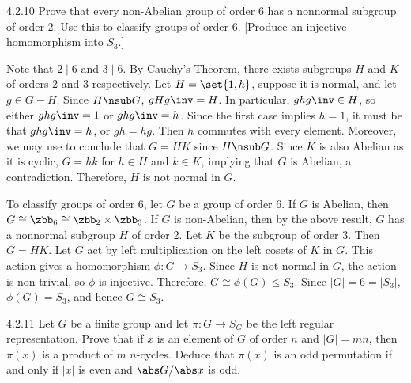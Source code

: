 \begin{exercise}{4.2.10}
	Prove that every non-Abelian group of order 6 has a nonnormal subgroup of order 2.
	Use this to classify groups of order 6. [Produce an injective homomorphism into $S_3$.]
\end{exercise}

\begin{sol}
	Note that $2 \mid 6$ and $3 \mid 6$.
	By Cauchy's Theorem, there exists subgroups $H$ and $K$ of orders 2 and 3 respectively.
	Let $H = \set{1, h}$, suppose it is normal, and let $g \in G - H$.
	Since $H \nsub G$, $gHg\inv = H$.
	In particular, $ghg\inv \in H$, so either $ghg\inv = 1$ or $ghg\inv = h$.
	Since the first case implies $h = 1$, it must be that $ghg\inv = h$, or $gh = hg$.
	Then $h$ commutes with every element.
	Moreover, we may use  to conclude that $G = HK$ since $H \nsub G$.
	Since $K$ is also Abelian as it is cyclic, $G = hk$ for $h \in H$ and $k \in K$, implying that $G$ is Abelian, a contradiction.
	Therefore, $H$ is not normal in $G$.

	To classify groups of order 6, let $G$ be a group of order 6.
	If $G$ is Abelian, then $G \cong \zbb_6 \cong \zbb_2 \times \zbb_3$.
	If $G$ is non-Abelian, then by the above result, $G$ has a nonnormal subgroup $H$ of order 2.
	Let $K$ be the subgroup of order 3.
	Then $G = HK$.
	Let $G$ act by left multiplication on the left cosets of $K$ in $G$.
	This action gives a homomorphism $\phi : G \to S_3$.
	Since $H$ is not normal in $G$, the action is non-trivial, so $\phi$ is injective.
	Therefore, $G \cong \phi(G) \leq S_3$.
	Since $|G| = 6 = |S_3|$, $\phi(G) = S_3$, and hence $G \cong S_3$.
\end{sol}

\begin{exercise}{4.2.11}
	Let $G$ be a finite group and let $\pi : G \to S_G$ be the left regular representation.
	Prove that if $x$ is an element of $G$ of order $n$ and $|G| = mn$, then $\pi(x)$ is a product of $m$ $n$-cycles.
	Deduce that $\pi(x)$ is an odd permutation if and only if $|x|$ is even and $\abs G/\abs x$ is odd.
\end{exercise}

